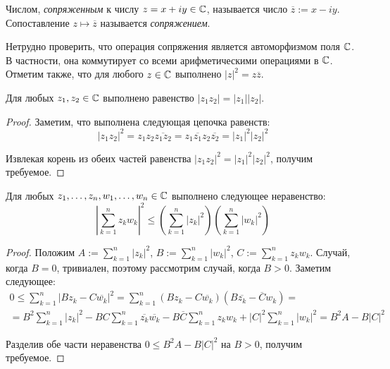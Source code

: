 \begin{definition}
	Числом, \textit{сопряженным} к числу $z = x + iy \in \mathbb{C}$, называется число $\overline{z} := x - iy$. Сопоставление $z \mapsto \overline{z}$ называется \textit{сопряжением}.
\end{definition}

\begin{note}
	Нетрудно проверить, что операция сопряжения является автоморфизмом поля $\mathbb{C}$. В частности, она коммутирует со всеми арифметическими операциями в $\mathbb{C}$. Отметим также, что для любого $z \in \mathbb{C}$ выполнено $|z|^2 = z\overline{z}$.
\end{note}

\begin{proposition}
	Для любых $z_1, z_2 \in \mathbb{C}$ выполнено равенство $|z_1z_2| = |z_1||z_2|$.
\end{proposition}

\begin{proof}
	Заметим, что выполнена следующая цепочка равенств:
	\[|z_1z_2|^2 = z_1z_2\overline{z_1z_2} = z_1\overline{z_1}z_2\overline{z_2} = |z_1|^2|z_2|^2\]
	
	Извлекая корень из обеих частей равенства $|z_1z_2|^2 = |z_1|^2|z_2|^2$, получим требуемое.
\end{proof}

\begin{proposition}
	Для любых $z_1, \dotsc, z_n, w_1, \dotsc, w_n \in \mathbb{C}$ выполнено следующее неравенство:
	\[\left|\sum_{k=1}^nz_kw_k\right|^2 \le \left(\sum_{k=1}^n|z_k|^2\right)\left(\sum_{k=1}^n|w_k|^2\right)\]
\end{proposition}

\begin{proof}
	Положим $A := \sum_{k=1}^n|z_k|^2$, $B := \sum_{k=1}^n|w_k|^2$, $C := \sum_{k=1}^nz_kw_k$. Случай, когда $B = 0$, тривиален, поэтому рассмотрим случай, когда $B > 0$. Заметим следующее:
	\begin{multline*}
		0 \le \sum_{k = 1}^n|Bz_k - C\overline{w_k}|^2 = \sum_{k = 1}^n(Bz_k - C\overline{w_k})(B\overline{z_k} - \overline Cw_k) =
		\\
		= B^2\sum_{k=1}^n|z_k|^2 - BC\sum_{k=1}^n\overline{z_k}\overline{w_k} - B\overline{C}\sum_{k=1}^nz_kw_k + |C|^2\sum_{k=1}^n|w_k|^2 = B^2A - B|C|^2
	\end{multline*}
	
	Разделив обе части неравенства $0 \le B^2A - B|C|^2$ на $B > 0$, получим требуемое.
\end{proof}

